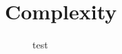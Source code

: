 \section{Complexity}

\begin{figure}[h]
  \centering
  
  \caption{test}\label{fig:optL}
\end{figure}

